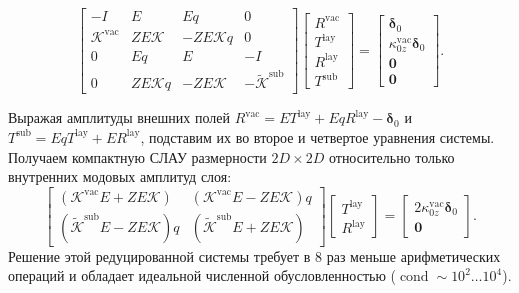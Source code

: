 \documentclass[a4paper,11pt]{article}
\begin{document}
\begin{mathbox}
\begin{equation}
\begin{bmatrix}
    -I & E & E q & 0 \\
    \mathcal{K}^{\text{vac}} & Z E \mathcal{K} & -Z E \mathcal{K} q & 0 \\
    0 & E q & E & -I \\
    0 & Z E \mathcal{K} q & -Z E \mathcal{K} & -\tilde{\mathcal{K}}^{\text{sub}}
\end{bmatrix}
\begin{bmatrix}
    R^{\text{vac}} \\
    T^{\text{lay}} \\
    R^{\text{lay}} \\
    T^{\text{sub}}
\end{bmatrix}
=
\begin{bmatrix}
    \boldsymbol{\delta}_0 \\
    \kappa_{0z}^{\text{vac}} \boldsymbol{\delta}_0 \\
    \mathbf{0} \\
    \mathbf{0}
\end{bmatrix}.
\label{eq:global_p_matrix}
\end{equation}
\end{mathbox}

\begin{remarkbox}
Выражая амплитуды внешних полей $R^{\text{vac}} = E T^{\text{lay}} + E q R^{\text{lay}} - \boldsymbol{\delta}_0$ и $T^{\text{sub}} = E q T^{\text{lay}} + E R^{\text{lay}}$, подставим их во второе и четвертое уравнения системы. Получаем компактную СЛАУ размерности $2D \times 2D$ относительно только внутренних модовых амплитуд слоя:
\begin{equation}
\begin{bmatrix}
    (\mathcal{K}^{\text{vac}} E + Z E \mathcal{K}) & (\mathcal{K}^{\text{vac}} E - Z E \mathcal{K}) q \\
    (\tilde{\mathcal{K}}^{\text{sub}} E - Z E \mathcal{K}) q & (\tilde{\mathcal{K}}^{\text{sub}} E + Z E \mathcal{K})
\end{bmatrix}
\begin{bmatrix}
    T^{\text{lay}} \\
    R^{\text{lay}}
\end{bmatrix}
=
\begin{bmatrix}
    2 \kappa_{0z}^{\text{vac}} \boldsymbol{\delta}_0 \\
    \mathbf{0}
\end{bmatrix}.
\label{eq:condensed_p_system}
\end{equation}
Решение этой редуцированной системы требует в 8 раз меньше арифметических операций и обладает идеальной численной обусловленностью ($\operatorname{cond} \sim 10^2 \dots 10^4$).
\end{remarkbox}
\end{document}
